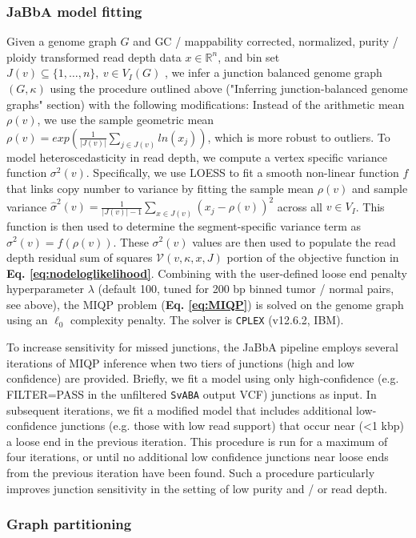 \documentclass[phd,tocprelim]{cornell}
\begin{document}
\subsubsection*{JaBbA model fitting}
Given a genome graph $G$ and GC / mappability corrected, normalized, purity / ploidy transformed read depth data $x \in \mathbb{R}^n$, and bin set $J(v) \subseteq \{1, \ldots, n\},~v \in V_I(G)$ , we infer a junction balanced genome graph $(G, \kappa)$ using the procedure outlined above ("Inferring junction-balanced genome graphs" section) with the following modifications:  Instead of the arithmetic mean $\rho(v)$, we use the sample geometric mean $\rho(v) = exp(\frac{1}{|J(v)|}\sum_{j \in J(v)} ln(x_j))$, which is more robust to outliers.  To model heteroscedasticity in read depth, we compute a vertex specific variance function $\sigma^2(v)$. Specifically, we use LOESS to fit a smooth non-linear function $f$ that links copy number to variance by fitting the sample mean $\rho(v)$ and sample variance  $\hat{\sigma}^2(v) = \frac{1}{|J(v)|-1} \sum_{x \in J(v)} (x_j - \rho(v))^2$ across all $v \in V_I$.  This function is then used to determine the segment-specific variance term as $\sigma^2(v) = f(\rho(v))$.  These $\sigma^2(v)$ values are then used to populate the read depth residual sum of squares $\mathcal{V}(v, \kappa, x, J)$ portion of the objective function in \textbf{Eq. \ref{eq:nodeloglikelihood}}. Combining with the user-defined loose end penalty hyperparameter $\lambda$ (default 100, tuned for 200 bp binned tumor / normal pairs, see above), the MIQP problem (\textbf{Eq. \ref{eq:MIQP}}) is solved on the genome graph using an $\ell_0$ complexity penalty. The solver is \texttt{CPLEX} (v12.6.2, IBM).

To increase sensitivity for missed junctions, the JaBbA pipeline employs several iterations of MIQP inference when two tiers of junctions (high and low confidence) are provided.  Briefly, we fit a model using only high-confidence (e.g. FILTER=PASS in the unfiltered \texttt{SvABA} output VCF) junctions as input.  In subsequent iterations, we fit a modified model that includes additional low-confidence junctions (e.g. those with low read support) that occur near (<1 kbp) a loose end in the previous iteration.  This procedure is run for a maximum of four iterations, or until no additional low confidence junctions near loose ends from the previous iteration have been found.   Such a procedure particularly improves junction sensitivity in the setting of low purity and / or read depth. 

\subsubsection*{Graph partitioning}
\end{document}
